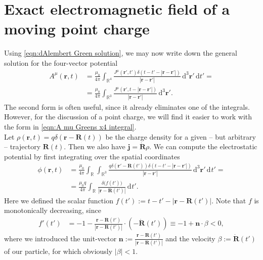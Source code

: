 \documentclass[english, parskip=full]{scrartcl}
\newcommand{\intr}{}
\newcommand{\kla}{}
\newcommand{\tecxt}{}
\begin{document}
\section{Exact electromagnetic field of a moving point charge}
Using \autoref{eqn:dAlembert Green solution}, we may now write down the general solution for the four-vector potential 
\begin{align}
A^\mu (\textbf{r},t) &= \frac{\mu_0}{4\pi} \intr\int_{\mathbb{R}^{4}} \frac{J^\mu (\textbf{r}',t') \delta (t - t' - |\textbf{r} - \textbf{r}'|)}{|\textbf{r} - \textbf{r}'|} \, \mathrm{d}^{3}\textbf{r}'\,\tecxt\text{d}t' =  \label{eqn:A mu Greens x4 integral}\\
&= \frac{\mu_0}{4\pi} \intr\int_{\mathbb{R}^{3}} \frac{J^\mu (\textbf{r}', t - |\textbf{r} - \textbf{r}'|)}{|\textbf{r} - \textbf{r}'|} \, \mathrm{d}^{3}\textbf{r}'. \label{eqn:A mu Greens r3 integral}
\end{align}
The second form is often useful, since it already eliminates one of the integrals.
However, for the discussion of a point charge, we will find it easier to work with the form in \autoref{eqn:A mu Greens x4 integral}.
\\
Let $\rho(\textbf{r}, t) = q \delta (\textbf{r} - \textbf{R}(t))$ be the charge density for a given -- but arbitrary -- trajectory $\textbf{R}(t)$.
Then we also have $\textbf{j} = \dot{\textbf{R}} \rho$.
We can compute the electrostatic potential by first integrating over the spatial coordinates
\begin{align}
\phi(\textbf{r},t) &= \frac{\mu_0}{4\pi} \intr\int_{\mathbb{R}^{ }} \intr\int_{\mathbb{R}^{3}} \frac{q\delta (\textbf{r}' - \textbf{R}(t')) \delta (t - t' - |\textbf{r} - \textbf{r}'|)}{|\textbf{r} - \textbf{r}'|} \, \mathrm{d}^{3}\textbf{r}' \, \mathrm{d}^{ }t' = \\
&= \frac{\mu_0 q}{4\pi} \intr\int_{\mathbb{R}^{ }} \frac{\delta \big(f(t')\big)}{|\textbf{r} - \textbf{R}(t')|} \, \mathrm{d}^{ }t'.
\end{align}
Here we defined the scalar function $f(t') := t - t' - |\textbf{r} - \textbf{R}(t')|$.
Note that $f$ is monotonically decreasing, since
\begin{align}
f'(t') &= -1 - \frac{\textbf{r} - \textbf{R}(t')}{|\textbf{r} - \textbf{R}(t')|} \cdot \kla\left(  - \dot{\textbf{R}}(t') \right) \equiv -1 + \textbf{n}\cdot \beta < 0,
\end{align}
where we introduced the unit-vector $\textbf{n} := \frac{\textbf{r} - \textbf{R}(t')}{|\textbf{r} - \textbf{R}(t')|}$ and the velocity $\beta := \dot{\textbf{R}}(t')$ of our particle, for which obviously $|\beta| < 1$.
\end{document}
